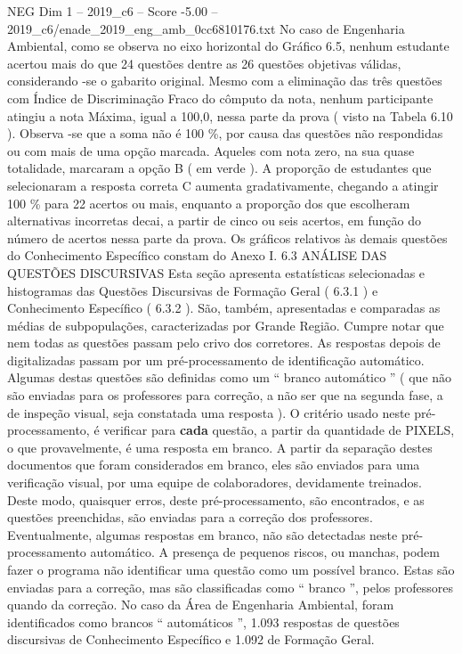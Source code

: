 \begin{textsample}{NEG Dim 1 – 2019\_c6 – Score -5.00 – 2019\_c6/enade\_2019\_eng\_amb\_0cc6810176.txt}
No caso de Engenharia Ambiental, como se observa no eixo horizontal do Gráfico 6.5, nenhum estudante acertou mais do que 24 questões dentre as 26 questões objetivas válidas, considerando -se o gabarito original.
Mesmo com a eliminação das três questões com Índice de Discriminação Fraco do cômputo da nota, nenhum participante atingiu a nota Máxima, igual a 100,0, nessa parte da prova ( visto na Tabela 6.10 ).
Observa -se que a soma não é 100 \%, por causa das questões não respondidas ou com mais de uma opção marcada.
Aqueles com nota zero, na sua quase totalidade, marcaram a opção B ( em verde ).
A proporção de estudantes que selecionaram a resposta correta C aumenta gradativamente, chegando a atingir 100 \% para 22 acertos ou mais, enquanto a proporção dos que escolheram alternativas incorretas decai, a partir de cinco ou seis acertos, em função do número de acertos nessa parte da prova.
Os gráficos relativos às demais questões do Conhecimento Específico constam do Anexo I. 6.3 ANÁLISE DAS QUESTÕES DISCURSIVAS Esta seção apresenta estatísticas selecionadas e histogramas das Questões Discursivas de Formação Geral ( 6.3.1 ) e Conhecimento Específico ( 6.3.2 ).
São, também, apresentadas e comparadas as médias de subpopulações, caracterizadas por Grande Região.
Cumpre notar que nem todas as questões passam pelo crivo dos corretores.
As respostas depois de digitalizadas passam por um pré-processamento de identificação automático.
Algumas destas questões são definidas como um “ branco automático ” ( que não são enviadas para os professores para correção, a não ser que na segunda fase, a de inspeção visual, seja constatada uma resposta ).
O critério usado neste pré-processamento, é verificar para \textbf{cada} questão, a partir da quantidade de PIXELS, o que provavelmente, é uma resposta em branco.
A partir da separação destes documentos que foram considerados em branco, eles são enviados para uma verificação visual, por uma equipe de colaboradores, devidamente treinados.
Deste modo, quaisquer erros, deste pré-processamento, são encontrados, e as questões preenchidas, são enviadas para a correção dos professores.
Eventualmente, algumas respostas em branco, não são detectadas neste pré-processamento automático.
A presença de pequenos riscos, ou manchas, podem fazer o programa não identificar uma questão como um possível branco.
Estas são enviadas para a correção, mas são classificadas como “ branco ”, pelos professores quando da correção.
No caso da Área de Engenharia Ambiental, foram identificados como brancos “ automáticos ”, 1.093 respostas de questões discursivas de Conhecimento Específico e 1.092 de Formação Geral.

\end{textsample}
